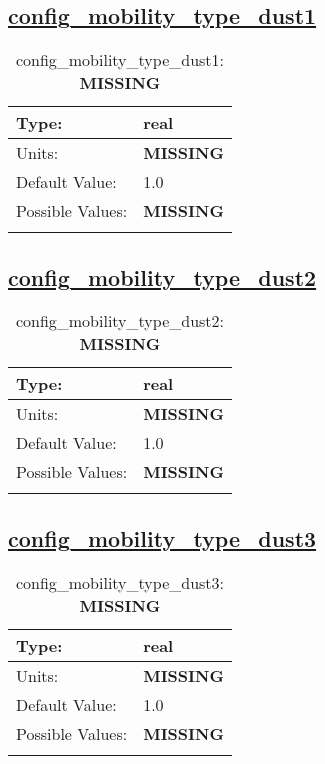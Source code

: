 \subsection[config\_mobility\_type\_dust1]{\hyperref[sec:nm_tab_biogeochemistry]{config\_mobility\_type\_dust1}}
\label{subsec:nm_sec_config_mobility_type_dust1}
\begin{center}
\begin{longtable}{| p{2.0in} || p{4.0in} |}
    \hline
    Type: & real \\
    \hline
    Units: & {\bf \color{red} MISSING} \\
    \hline
    Default Value: & 1.0 \\
    \hline
    Possible Values: & {\bf \color{red} MISSING} \\
    \hline
    \caption{config\_mobility\_type\_dust1: {\bf \color{red} MISSING}}
\end{longtable}
\end{center}
\subsection[config\_mobility\_type\_dust2]{\hyperref[sec:nm_tab_biogeochemistry]{config\_mobility\_type\_dust2}}
\label{subsec:nm_sec_config_mobility_type_dust2}
\begin{center}
\begin{longtable}{| p{2.0in} || p{4.0in} |}
    \hline
    Type: & real \\
    \hline
    Units: & {\bf \color{red} MISSING} \\
    \hline
    Default Value: & 1.0 \\
    \hline
    Possible Values: & {\bf \color{red} MISSING} \\
    \hline
    \caption{config\_mobility\_type\_dust2: {\bf \color{red} MISSING}}
\end{longtable}
\end{center}
\subsection[config\_mobility\_type\_dust3]{\hyperref[sec:nm_tab_biogeochemistry]{config\_mobility\_type\_dust3}}
\label{subsec:nm_sec_config_mobility_type_dust3}
\begin{center}
\begin{longtable}{| p{2.0in} || p{4.0in} |}
    \hline
    Type: & real \\
    \hline
    Units: & {\bf \color{red} MISSING} \\
    \hline
    Default Value: & 1.0 \\
    \hline
    Possible Values: & {\bf \color{red} MISSING} \\
    \hline
    \caption{config\_mobility\_type\_dust3: {\bf \color{red} MISSING}}
\end{longtable}
\end{center}
